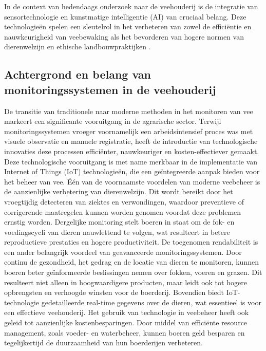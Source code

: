 In de context van hedendaags onderzoek naar de veehouderij is de integratie van sensortechnologie en kunstmatige intelligentie (AI) van cruciaal belang. 
Deze technologieën spelen een sleutelrol in het verbeteren van zowel de efficiëntie en nauwkeurigheid van veebewaking als het bevorderen van hogere normen van dierenwelzijn en ethische landbouwpraktijken \autocite{PastureIo}.
\subsection{Achtergrond en belang van monitoringssystemen in de veehouderij}
De transitie van traditionele naar moderne methoden in het monitoren van vee markeert een significante vooruitgang in de agrarische sector. Terwijl monitoringssystemen vroeger voornamelijk een arbeidsintensief proces was met visuele observatie en manuele registratie, heeft de introductie van technologische innovaties deze processen efficiënter, nauwkeuriger en kosten-effectiever gemaakt\autocite{ToAgriculture}. Deze technologische vooruitgang is met name merkbaar in de implementatie van Internet of Things (IoT) technologieën, die een geïntegreerde aanpak bieden voor het beheer van vee\autocite{IntuzIoT}.
\newline
Één  van de voornaamste voordelen van moderne veebeheer is de aanzienlijke verbetering van dierenwelzijn. Dit wordt bereikt door het vroegtijdig detecteren van ziektes en verwondingen, waardoor preventieve of corrigerende maatregelen kunnen worden genomen voordat deze problemen ernstig worden. Dergelijke monitoring stelt boeren in staat om de fok- en voedingscycli van dieren nauwlettend te volgen, wat resulteert in betere reproductieve prestaties en hogere productiviteit\autocite{ToAgriculture}.
\newline
De toegenomen rendabiliteit is een ander belangrijk voordeel van geavanceerde monitoringssystemen. Door continu de gezondheid, het gedrag en de locatie van dieren te monitoren, 
kunnen boeren beter geïnformeerde beslissingen nemen over fokken, voeren en grazen. Dit resulteert niet alleen in hoogwaardigere producten, maar leidt ook tot hogere opbrengsten en verhoogde winsten voor de boerderij\autocite{ToAgriculture}. 
Bovendien biedt IoT-technologie gedetailleerde real-time gegevens over de dieren, wat essentieel is voor een effectieve veehouderij\autocite{IntuzIoT}.
\newline
Het gebruik van technologie in veebeheer heeft ook geleid tot aanzienlijke kostenbesparingen. 
Door middel van efficiënte resource management, zoals voeder- en waterbeheer, kunnen boeren geld besparen en tegelijkertijd de duurzaamheid van hun boerderijen verbeteren. 
